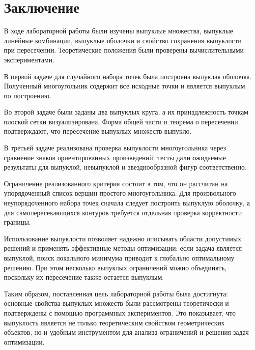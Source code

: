 \section{Заключение}

В ходе лабораторной работы были изучены выпуклые множества, выпуклые линейные комбинации, выпуклые оболочки и свойство сохранения выпуклости при пересечении. Теоретические положения были проверены вычислительными экспериментами.

В первой задаче для случайного набора точек была построена выпуклая
оболочка. Полученный многоугольник содержит все исходные точки и
является выпуклым по построению. 

Во второй задаче были заданы два
выпуклых круга, а их принадлежность точкам плоской сетки
визуализирована. Форма общей части и теорема о пересечении
подтверждают, что пересечение выпуклых множеств выпукло.

В третьей
задаче реализована проверка выпуклости многоугольника через сравнение
знаков ориентированных произведений: тесты дали ожидаемые результаты
для выпуклой, невыпуклой и звезднообразной фигур соответственно.

Ограничение реализованного критерия состоит в том, что он рассчитан на упорядоченный список вершин простого многоугольника. Для произвольного неупорядоченного набора точек сначала следует построить выпуклую оболочку, а для самопересекающихся контуров требуется отдельная проверка корректности границы.

Использование выпуклости позволяет надежно описывать области допустимых решений и применять эффективные методы оптимизации: если задача является выпуклой, поиск
локального минимума приводит к глобально оптимальному решению. При
этом несколько выпуклых ограничений можно объединять, поскольку их
пересечение также остается выпуклым.

Таким образом, поставленная цель лабораторной работы была достигнута:
основные свойства выпуклых множеств были рассмотрены теоретически и
подтверждены с помощью программных экспериментов. Это показывает, что выпуклость является
не только теоретическим свойством геометрических объектов, но и
удобным инструментом для анализа ограничений и решения задач
оптимизации.
